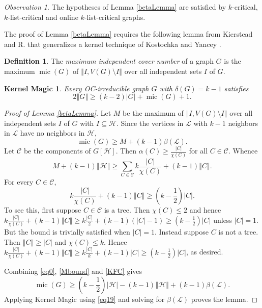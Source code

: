 \documentclass[10pt]{article}
\theoremstyle{plain}
\newtheorem*{KernelMagic}{Kernel Magic}
\theoremstyle{definition}
\newtheorem*{TheDefinition}{Definition}
\theoremstyle{remark}
\newtheorem*{observation}{Observation}
\newcommand{\fancy}[1]{\mathcal{#1}}
\newcommand{\C}[1]{\fancy{C}_{#1}}
\renewcommand{\L}{\fancy{L}}
\newcommand{\HH}{\fancy{H}}
\newcommand{\card}[1]{\left|#1\right|}
\newcommand{\size}[1]{\left\Vert#1\right\Vert}
\newcommand{\parens}[1]{\left( #1 \right)}
\newcommand{\mic}{\operatorname{mic}}
\def\C{\fancy{C}}
\begin{document}
\begin{observation}
The hypotheses of Lemma \ref{betaLemma} are satisfied by $k$-critical, $k$-list-critical and online $k$-list-critical graphs.
\end{observation}

The proof of Lemma \ref{betaLemma} requires the following lemma from Kierstead and R. \cite{KernelMagic} 
that generalizes a kernel technique of Kostochka and Yancey \cite{kostochkayancey2012ore}.

\begin{TheDefinition} The \emph{maximum independent cover number }of a graph $G$
	is the maximum $\mic(G)$ of $\size{I, V(G) \setminus I}$ over all independent sets $I$
	of $G$. 
\end{TheDefinition}

\begin{KernelMagic}\label{ConsantListMicStrength} 
	Every OC-irreducible graph $G$ with $\delta(G) = k-1$ satisfies
	\[2\size{G} \ge (k-2)\card{G} + \mic(G) + 1.\]
\end{KernelMagic}

\begin{proof}[Proof of Lemma \ref{betaLemma}]
Let $M$ be the maximum of $\size{I, V(G) \setminus I}$ over all independent sets $I$ of $G$ with $I \subseteq \HH$.   Since the vertices in $\L$ with $k-1$ neighbors in $\L$ have no neighbors in $\HH$,
	\begin{equation}
		\mic(G) \ge M + (k-1)\beta(\L).\label{eq0}
	\end{equation}
	Let $\C$ be the components of $G[\HH]$.  Then $\alpha(C) \ge \frac{\card{C}}{\chi(C)}$ for all $C \in \C$.  Whence
	\begin{equation}
	  M + (k-1)\size{\HH} \ge \sum_{C \in \C} k\frac{\card{C}}{\chi(C)} + (k-1)\size{C}.
	  \label{Mbound}
	\end{equation}
	For every $C \in \C$,
	\begin{equation}
	 k\frac{\card{C}}{\chi(C)} + (k-1)\size{C} \ge \parens{k - \frac12}\card{C}.
	 \label{KFC}
	\end{equation}
	To see this, first suppose $C \in \C$ is a tree. Then $\chi(C) \le 2$ and hence 
	$k\frac{\card{C}}{\chi(C)} + (k-1)\size{C} \ge k\frac{\card{C}}{2} + (k-1)(\card{C} - 1) \ge (k-\frac12)\card{C}$ unless $\card{C} = 1$.  But the bound is trivially satisfied when $\card{C} = 1$.
	Instead suppose $C$ is not a tree. Then $\size{C} \ge \card{C}$ and $\chi(C) \le k$. Hence $k\frac{\card{C}}{\chi(C)} + (k-1)\size{C} \ge k\frac{\card{C}}{k} + (k-1)\card{C} \ge (k - \frac12)\card{C}$, as desired.
	
	Combining \eqref{eq0}, \eqref{Mbound} and \eqref{KFC} gives
	\begin{equation}
	 \mic(G) \ge \parens{k-\frac12}\card{\HH} - (k-1)\size{\HH} + (k-1)\beta(\L).
	 \label{eq19}
	\end{equation}
	Applying Kernel Magic using \eqref{eq19} and solving for $\beta(\L)$ proves the lemma.
\end{proof}
\end{document}
